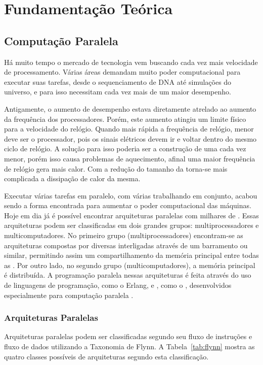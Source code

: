 \chapter{Fundamentação Teórica}
\label{cap2}

\section{Computação Paralela}

Há muito tempo o mercado de tecnologia vem buscando cada vez mais velocidade de processamento. Várias áreas demandam muito poder computacional para executar suas tarefas, desde o sequenciamento de DNA até simulações do universo, e para isso necessitam cada vez mais de um maior desempenho.

Antigamente, o aumento de desempenho estava diretamente atrelado ao aumento da frequência dos processadores. Porém, este aumento atingiu um limite físico para a velocidade do relógio. Quando mais rápida a frequência de relógio, menor deve ser o processador, pois os sinais elétricos devem ir e voltar dentro do mesmo ciclo de relógio. A solução para isso poderia ser a construção de uma \cpu cada vez menor, porém isso causa problemas de aquecimento, afinal uma maior frequência de relógio gera mais calor. Com a redução do tamanho da \cpu torna-se mais complicada a dissipação de calor da mesma.

Executar várias tarefas em paralelo, com várias \cpus trabalhando em conjunto, acabou sendo a forma encontrada para aumentar o poder computacional das máquinas. Hoje em dia já é possível encontrar arquiteturas paralelas com milhares de \cpus. Essas arquiteturas podem ser classificadas em dois grandes grupos: multiprocessadores e multicomputadores. No primeiro grupo (multiprocessadores) encontram-se as arquiteturas compostas por diversas \cpus interligadas através de um barramento ou similar, permitindo assim um compartilhamento da memória principal entre todas as \cpus. Por outro lado, no segundo grupo (multicomputadores), a memória principal é distribuída. A programação paralela nessas arquiteturas é feita através do uso de linguagens de programação, como o Erlang, e \apis, como o \mpi, desenvolvidos especialmente para computação paralela \cite{Tanenbaum2015}.

\subsection{Arquiteturas Paralelas}

Arquiteturas paralelas podem ser classificadas segundo seu fluxo de instruções e fluxo de dados utilizando a Taxonomia de Flynn\cite{Flynn1972}. A Tabela~\ref{tab:flynn} mostra as quatro classes possíveis de arquiteturas segundo esta classificação.

